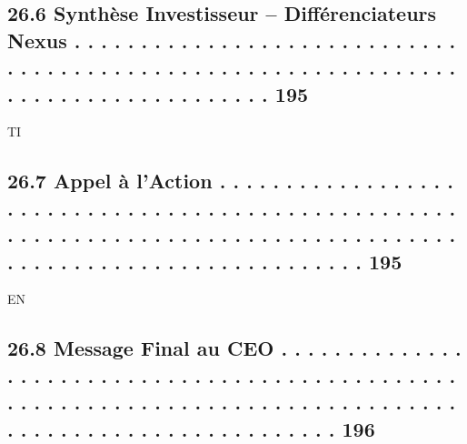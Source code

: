 \subsection{26.6    Synthèse Investisseur – Différenciateurs Nexus . . . . . . . . . . . . . . . . . . . . . . . . . . . . . . . . . . . . . . . . . . . . . . . . . . . . . . . . . . . . . . . . . . . . . . . . . . . . . . . . . . . 195}
\vspace{0.5em}
\vspace{0.5em}
\vspace{0.5em}
\vspace{0.5em}
TI\\
\subsection{26.7    Appel à l’Action . . . . . . . . . . . . . . . . . . . . . . . . . . . . . . . . . . . . . . . . . . . . . . . . . . . . . . . . . . . . . . . . . . . . . . . . . . . . . . . . . . . . . . . . . . . . . . . . . . . . . . . . . . . . . . . . . 195}
\vspace{0.5em}
\vspace{0.5em}
\vspace{0.5em}
\vspace{0.5em}
EN\\
\subsection{26.8    Message Final au CEO . . . . . . . . . . . . . . . . . . . . . . . . . . . . . . . . . . . . . . . . . . . . . . . . . . . . . . . . . . . . . . . . . . . . . . . . . . . . . . . . . . . . . . . . . . . . . . . . . . . . . . . . . . . 196}
